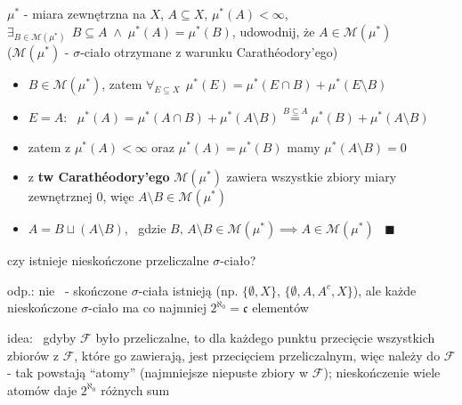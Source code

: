 \documentclass[a4paper,12pt]{article}
\begin{document}
\bigskip
{} \; \(\mu^*\) - miara zewnętrzna na \(X\), \; \(A \subseteq X\), \; \(\mu^*(A) < \infty\), \; \(\exists_{B \in \mathcal{M}(\mu^*)} \;\, B \subseteq A \;\land\; \mu^*(A) = \mu^*(B)\), \; udowodnij, że \(A \in \mathcal{M}(\mu^*)\) \\
(\(\mathcal{M}(\mu^*)\) - \(\sigma\)-ciało otrzymane z warunku Carathéodory'ego)
\begin{itemize}
    \item \(B \in \mathcal{M}(\mu^*)\), zatem \(\forall_{E \subseteq X} \;\, \mu^*(E) = \mu^*(E \cap B) + \mu^*(E \setminus B)\)
    \item \(E = A\): \, \(\mu^*(A) = \mu^*(A \cap B) + \mu^*(A \setminus B) \overset{B \subseteq A}{=} \mu^*(B) + \mu^*(A \setminus B)\)
    \item zatem z \(\mu^*(A) < \infty\) oraz \(\mu^*(A) = \mu^*(B)\) mamy \(\mu^*(A \setminus B) = 0\)
    \item z \textbf{tw Carathéodory'ego} \(\mathcal{M}(\mu^*)\) zawiera wszystkie zbiory miary zewnętrznej \(0\), więc \(A \setminus B \in \mathcal{M}(\mu^*)\)
    \item \(A = B \sqcup (A \setminus B)\), \, gdzie \(B, \, A \setminus B \in \mathcal{M}(\mu^*) \implies A \in \mathcal{M}(\mu^*)\) \, \(\blacksquare\)
\end{itemize}

\bigskip
{} \; czy istnieje nieskończone przeliczalne \(\sigma\)-ciało?

\smallskip
odp.: nie \, - skończone \(\sigma\)-ciała istnieją (np. \(\{\emptyset, X\}\), \(\{\emptyset, A, A^c, X\}\)), ale każde nieskończone \(\sigma\)-ciało ma co najmniej \(2^{\aleph_0} = \mathfrak{c}\) elementów

\smallskip
idea: \, gdyby \(\mathcal{F}\) było przeliczalne, to dla każdego punktu przecięcie wszystkich zbiorów z \(\mathcal{F}\), które go zawierają, jest przecięciem przeliczalnym, więc należy do \(\mathcal{F}\) - tak powstają \enquote{atomy} (najmniejsze niepuste zbiory w \(\mathcal{F}\)); nieskończenie wiele atomów daje \(2^{\aleph_0}\) różnych sum
\end{document}
